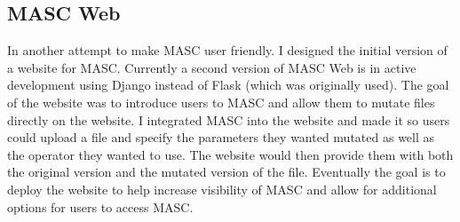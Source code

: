 \subsection{MASC Web}
\label{ch3:subsec:web}

In another attempt to make MASC user friendly. I designed the initial version of a website for MASC. Currently a second version of MASC Web is in active development using Django instead of Flask (which was originally used). The goal of the website was to introduce users to MASC and allow them to mutate files directly on the website. I integrated MASC into the website and made it so users could upload a file and specify the parameters they wanted mutated as well as the operator they wanted to use. The website would then provide them with both the original version and the mutated version of the file. Eventually the goal is to deploy the website to help increase visibility of MASC and allow for additional options for users to access MASC.


